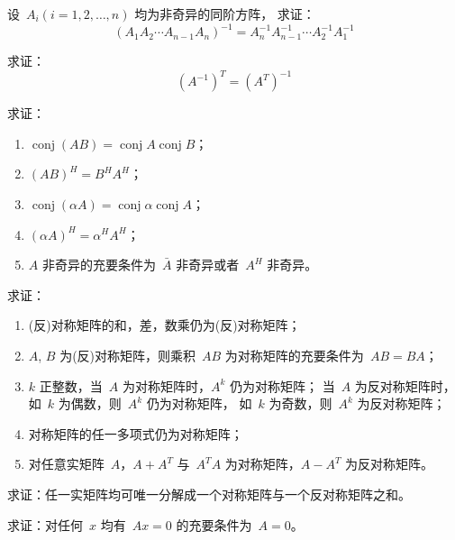 \documentclass[twoside,openright]{book}
\begin{document}
\begin{CJK*}{UTF8}{}
\begin{quest}
\label{quest:7}
设\ $A_i(i=1,2,\dotsc,n)$ 均为非奇异的同阶方阵，
求证：
\[
(A_1A_2\dotsm A_{n-1}A_n)^{-1}=A_n^{-1}A_{n-1}^{-1}\dotsm A_2^{-1}A_1^{-1}
\]
\end{quest}

\begin{quest}
\label{quest:8}
求证：
\[
(A^{-1})^T=(A^T)^{-1}
\]
\end{quest}

\begin{quest}
\label{quest:9}
求证：
\begin{enumerate}
\item
$\operatorname{conj}(AB)=\operatorname{conj}A \operatorname{conj}B$；
\item
$(AB)^H=B^HA^H$；
\item
$\operatorname{conj}(\alpha A)=\operatorname{conj}\alpha \operatorname{conj}A$；
\item
$(\alpha A)^H=\alpha^HA^H$；
\item
$A$ 非奇异的充要条件为\ $\bar{A}$ 非奇异或者\ $A^H$ 非奇异。
\end{enumerate}
\end{quest}

\begin{quest}
\label{quest:10}
求证：
\begin{enumerate}
\item
(反)对称矩阵的和，差，数乘仍为(反)对称矩阵；
\item
$A$, $B$ 为(反)对称矩阵，则乘积\ $AB$ 为对称矩阵的充要条件为\ $AB=BA$；
\item
$k$ 正整数，当\ $A$ 为对称矩阵时，$A^k$ 仍为对称矩阵；
当\ $A$ 为反对称矩阵时，
如\ $k$ 为偶数，则\ $A^k$ 仍为对称矩阵，
如\ $k$ 为奇数，则\ $A^k$ 为反对称矩阵；
\item
对称矩阵的任一多项式仍为对称矩阵；
\item
对任意实矩阵\ $A$，$A+A^T$ 与\ $A^TA$ 为对称矩阵，$A-A^T$ 为反对称矩阵。
\end{enumerate}
\end{quest}

\begin{quest}
\label{quest:11}
求证：任一实矩阵均可唯一分解成一个对称矩阵与一个反对称矩阵之和。
\end{quest}

\begin{quest}
\label{quest:12}
求证：对任何\ $x$ 均有\ $Ax=0$ 的充要条件为\ $A=0$。
\end{quest}


\end{CJK*}
\end{document}
